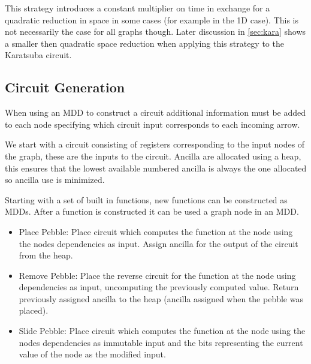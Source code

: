 This strategy introduces a constant multiplier on time in exchange for a
quadratic reduction in space in some cases (for example in the 1D case). This
is not necessarily the case for all graphs though. Later discussion in
\cref{sec:kara} shows a smaller then quadratic space reduction when applying
this strategy to the Karatsuba circuit.

\subsection{Circuit Generation}

When using an MDD to construct a circuit additional information must be added
to each node specifying which circuit input corresponds to each incoming arrow.

We start with a circuit consisting of registers corresponding to the input
nodes of the graph, these are the inputs to the circuit. Ancilla are allocated
using a heap\footnotemark, this ensures that the lowest available numbered
ancilla is always the one allocated so ancilla use is minimized.


Starting with a set of built in functions, new functions can be constructed as
MDDs. After a function is constructed it can be used a graph node in an MDD.

\begin{itemize}

    \item Place Pebble: Place circuit which computes the function at the node
	    using the nodes dependencies as input. Assign ancilla for the
	    output of the circuit from the heap.

    \item Remove Pebble: Place the reverse circuit for the function at the node
	    using dependencies as input, uncomputing the previously computed
	    value.  Return previously assigned ancilla to the heap (ancilla
	    assigned when the pebble was placed).

    \item Slide Pebble: Place circuit which computes the function at the node
	    using the nodes dependencies as immutable input and the bits representing the
	    current value of the node as the modified input.

\end{itemize}

